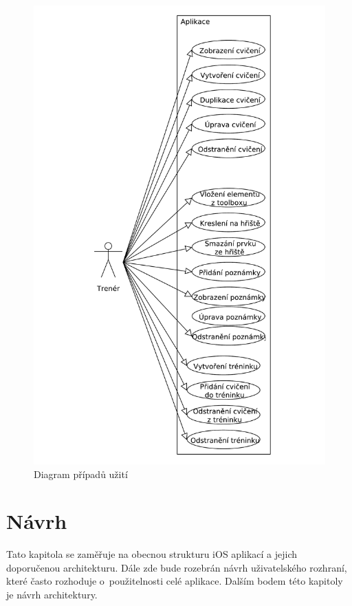 \documentclass[thesis=B,czech]{FITthesis}[2012/06/26]
\begin{document}
	\begin{figure}[h!t]
		\centering
		\includegraphics[width=\textwidth]{img/use_case}
		\caption{Diagram případů užití}
		\label{pic:use_case}
	\end{figure}

\chapter{Návrh}

	Tato kapitola se zaměřuje na obecnou strukturu iOS aplikací a jejich doporučenou architekturu. Dále zde bude rozebrán návrh uživatelského rozhraní, které často rozhoduje o~použitelnosti celé aplikace. Dalším bodem této kapitoly je návrh architektury.
\end{document}
